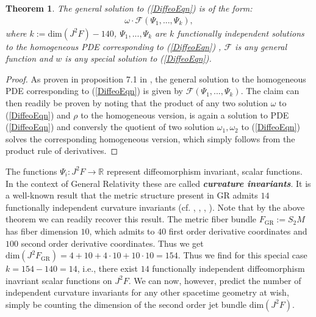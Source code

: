 \documentclass[%
 reprint,
nofootinbib,
 amsmath,amssymb,
 aps,
 prd,
floatfix,
]{revtex4-2}
\newtheorem{theorem}{Theorem}
\begin{document}
\begin{theorem}\label{FormalSol}
The general solution to (\ref{DiffeoEqn}) is of the form:
\begin{align}
    \omega \cdot \mathcal{F} \left (\Psi_1,...,\Psi_k \right ),
\end{align}
where $k:= \mathrm{dim}(J^2F) - 140$,  $\Psi_1,...,\Psi_k$ are $k$ functionally independent solutions to the homogeneous PDE corresponding to (\ref{DiffeoEqn}) , $\mathcal{F}$ is any general function and $w$ is any special solution to (\ref{DiffeoEqn}).
\end{theorem}
\begin{proof}
As proven in proposition 7.1 in \cite{seiler1994analysis}, the general solution to the homogeneous PDE corresponding to (\ref{DiffeoEqn}) is given by $\mathcal{F} \left (\Psi_1,...,\Psi_k \right )$. The claim can then readily be proven by noting that the product of any two solution $\omega$ to (\ref{DiffeoEqn}) and $\rho$ to the homogeneous version, is again a solution to PDE (\ref{DiffeoEqn}) and conversly the quotient of two solution $\omega_1,\omega_2$ to (\ref{DiffeoEqn}) solves the corresponding homogeneous version, which simply follows from the product rule of derivatives. \end{proof}

The functions $\Psi_i: J^2F \rightarrow \mathbb{R}$ represent diffeomorphism invariant, scalar functions. In the context of General Relativity these are called \textit{\textbf{curvature invariants}}. It is a well-known result that the metric structure present in GR admits $14$ functionally independent curvature invariants (cf. \cite{2009CQGra..26b5013C}, \cite{Zakhary1997}, \cite{2002IJMPD..11..827C}, \cite{doi:10.1063/1.531425}). 
Note that by the above theorem we can readily recover this result. The metric fiber bundle $F_{\text{GR}}:=S_2M$ has fiber dimension $10$, which admits to $40$ first order derivative coordinates and $100$ second order derivative coordinates. Thus we get $\mathrm{dim}(J^2F_{\text{GR}}) = 4+10+4\cdot10+10\cdot10 = 154$. Thus we find for this special case $k=154-140=14$, i.e., there exist $14$ functionally independent diffeomorphism inavriant scalar functions on $J^2F$. 
We can now, however, predict the number of independent curvature invariants for any other spacetime geometry at wish, simply be counting the dimension of the second order jet bundle $\mathrm{dim}(J^2F)$.
\end{document}
